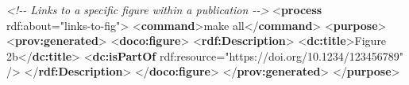 \documentclass[manuscript,authordraft]{acmart}
\newenvironment{Shaded}{}{}
\newcommand{\CommentTok}[1]{\textcolor[rgb]{0.38,0.63,0.69}{\textit{#1}}}
\newcommand{\KeywordTok}[1]{\textcolor[rgb]{0.00,0.44,0.13}{\textbf{#1}}}
\newcommand{\NormalTok}[1]{#1}
\newcommand{\OtherTok}[1]{\textcolor[rgb]{0.00,0.44,0.13}{#1}}
\newcommand{\StringTok}[1]{\textcolor[rgb]{0.25,0.44,0.63}{#1}}
\begin{document}
\begin{Shaded}
\begin{Highlighting}[]
  \CommentTok{\textless{}!{-}{-} Links to a specific figure within a publication {-}{-}\textgreater{}}
\NormalTok{  \textless{}}\KeywordTok{process}\OtherTok{ rdf:about=}\StringTok{"links{-}to{-}fig"}\NormalTok{\textgreater{}}
\NormalTok{    \textless{}}\KeywordTok{command}\NormalTok{\textgreater{}make all\textless{}/}\KeywordTok{command}\NormalTok{\textgreater{}}
\NormalTok{    \textless{}}\KeywordTok{purpose}\NormalTok{\textgreater{}}
\NormalTok{      \textless{}}\KeywordTok{prov:generated}\NormalTok{\textgreater{}}
\NormalTok{        \textless{}}\KeywordTok{doco:figure}\NormalTok{\textgreater{}}
\NormalTok{          \textless{}}\KeywordTok{rdf:Description}\NormalTok{\textgreater{}}
\NormalTok{            \textless{}}\KeywordTok{dc:title}\NormalTok{\textgreater{}Figure 2b\textless{}/}\KeywordTok{dc:title}\NormalTok{\textgreater{}}
\NormalTok{            \textless{}}\KeywordTok{dc:isPartOf}\OtherTok{ rdf:resource=}\StringTok{"https://doi.org/10.1234/123456789"}\NormalTok{ /\textgreater{}}
\NormalTok{          \textless{}/}\KeywordTok{rdf:Description}\NormalTok{\textgreater{}}
\NormalTok{        \textless{}/}\KeywordTok{doco:figure}\NormalTok{\textgreater{}}
\NormalTok{      \textless{}/}\KeywordTok{prov:generated}\NormalTok{\textgreater{}}
\NormalTok{    \textless{}/}\KeywordTok{purpose}\NormalTok{\textgreater{}}


\end{Highlighting}
\end{Shaded}
\end{document}
